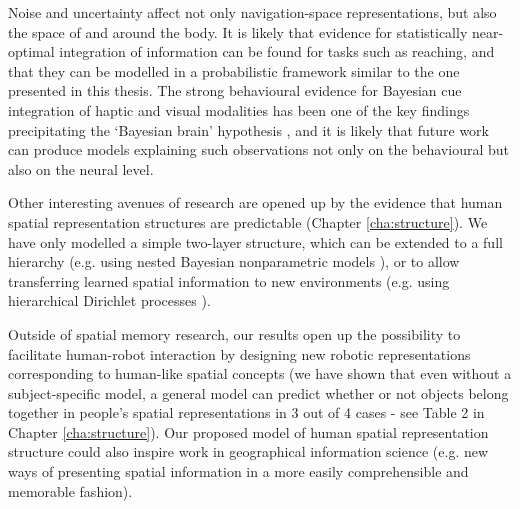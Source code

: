 Noise and uncertainty affect not only navigation-space representations, but also the space of and around the body. It is likely that evidence for statistically near-optimal integration of information can be found for tasks such as reaching, and that they can be modelled in a probabilistic framework similar to the one presented in this thesis. The strong behavioural evidence for Bayesian cue integration of haptic and visual modalities \citep{ernst2002humans} has been one of the key findings precipitating the `Bayesian brain' hypothesis \citep{knill2004bayesian}, and it is likely that future work can produce models explaining such observations not only on the behavioural but also on the neural level.

Other interesting avenues of research are opened up by the evidence that human spatial representation structures are predictable (Chapter \ref{cha:structure}). We have only modelled a simple two-layer structure, which can be extended to a full hierarchy (e.g. using nested Bayesian nonparametric models \citep{blei2010nested}), or to allow transferring learned spatial information to new environments (e.g. using hierarchical Dirichlet processes \citep{teh2006hierarchical}). 

Outside of spatial memory research, our results open up the possibility to facilitate human-robot interaction by designing new robotic representations corresponding to human-like spatial concepts (we have shown that even without a subject-specific model, a general model can predict whether or not objects belong together in people's spatial representations in 3 out of 4 cases - see Table 2 in Chapter \ref{cha:structure}). Our proposed model of human spatial representation structure could also inspire work in geographical information science (e.g. new ways of presenting spatial information in a more easily comprehensible and memorable fashion).




 



